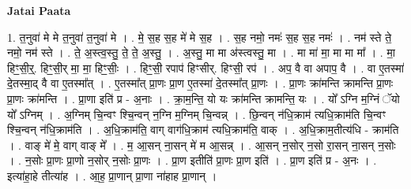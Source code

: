 \documentclass[17pt]{extarticle}
\begin{document}
\textbf{Jatai Paata} \newline

1. त॒नुवा॑ मे मे त॒नुवा॑ त॒नुवा॑ मे । . मे॒ स॒ह स॒ह मे॑ मे स॒ह । . स॒ह नमो॒ नमः॑ स॒ह स॒ह नमः॑ । . नम॑ स्ते ते॒ नमो॒ नम॑ स्ते । . ते॒ अ॒स्त्व॒स्तु॒ ते॒ ते॒ अ॒स्तु॒ । . अ॒स्तु॒ मा मा अ॑स्त्वस्तु॒ मा । . मा मा॑ मा॒ मा मा मा᳚ । . मा॒ हिꣳ॒॒सी॒र्॒. हिꣳ॒॒सी॒र् मा॒ मा॒ हिꣳ॒॒सीः॒ । . हिꣳ॒॒सी॒ रपाप॑ हिꣳसीर्. हिꣳसी॒ रप॑ । . अप॒ वै वा अपाप॒ वै । . वा ए॒तस्मा॑ दे॒तस्मा॒द् वै वा ए॒तस्मा᳚त् । . ए॒तस्मा᳚त् प्रा॒णः प्रा॒ण ए॒तस्मा॑ दे॒तस्मा᳚त् प्रा॒णः । . प्रा॒णः क्रा॑मन्ति क्रामन्ति प्रा॒णः प्रा॒णः क्रा॑मन्ति । . प्रा॒णा इति॑ प्र - अ॒नाः । . क्रा॒म॒न्ति॒ यो यः क्रा॑मन्ति क्रामन्ति॒ यः । . यो᳚ ऽग्नि म॒ग्निं ॅयो यो᳚ ऽग्निम् । . अ॒ग्निम् चि॒न्वꣳ श्चि॒न्वन् न॒ग्नि म॒ग्निम् चि॒न्वन्न् । . छि॒न्वन् न॑धि॒क्राम॑ त्यधि॒क्राम॑ति चि॒न्वꣳ श्चि॒न्वन् न॑धि॒क्राम॑ति । . अ॒धि॒क्राम॑ति॒ वाग् वाग॑धि॒क्राम॑ त्यधि॒क्राम॑ति॒ वाक् । . अ॒धि॒क्राम॒तीत्य॑धि - क्राम॑ति । . वाङ् मे॑ मे॒ वाग् वाङ् मे᳚ । . म॒ आ॒सन् ना॒सन् मे॑ म आ॒सन्न् । . आ॒सन् न॒सोर् न॒सो रा॒सन् ना॒सन् न॒सोः । . न॒सोः प्रा॒णः प्रा॒णो न॒सोर् न॒सोः प्रा॒णः । . प्रा॒ण इतीति॑ प्रा॒णः प्रा॒ण इति॑ । . प्रा॒ण इति॑ प्र - अ॒नः । . इत्या॑हा॒हे तीत्या॑ह । . आ॒ह॒ प्रा॒णान् प्रा॒णा ना॑हाह प्रा॒णान् । \newline
\end{document}
